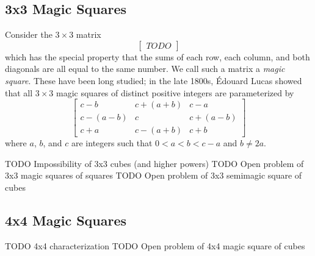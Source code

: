 \documentclass[11pt]{amsart}
\begin{document}
\subsection{3x3 Magic Squares}
Consider the $3 \times 3$ matrix
\begin{equation*}
  \begin{bmatrix} TODO
  \end{bmatrix}
\end{equation*}
which has the special property that the sums of each row, each column, and both diagonals are all equal to the same number. We call such a matrix a \emph{magic square}. These have been long studied; in the late 1800s, \'{E}douard Lucas showed that all $3 \times 3$ magic squares of distinct positive integers are parameterized by
\begin{equation*}
  \begin{bmatrix} c - b & c + (a + b) & c - a \\ c - (a - b) & c & c + (a - b) \\ c + a & c - (a + b) & c + b
  \end{bmatrix}
\end{equation*}
where $a$, $b$, and $c$ are integers such that $0 < a < b < c - a$ and $b \neq 2a$.

TODO Impossibility of 3x3 cubes (and higher powers)
TODO Open problem of 3x3 magic squares of squares
TODO Open problem of 3x3 semimagic square of cubes

\subsection{4x4 Magic Squares}
TODO 4x4 characterization
TODO Open problem of 4x4 magic square of cubes

\nocite{*}


\end{document}

